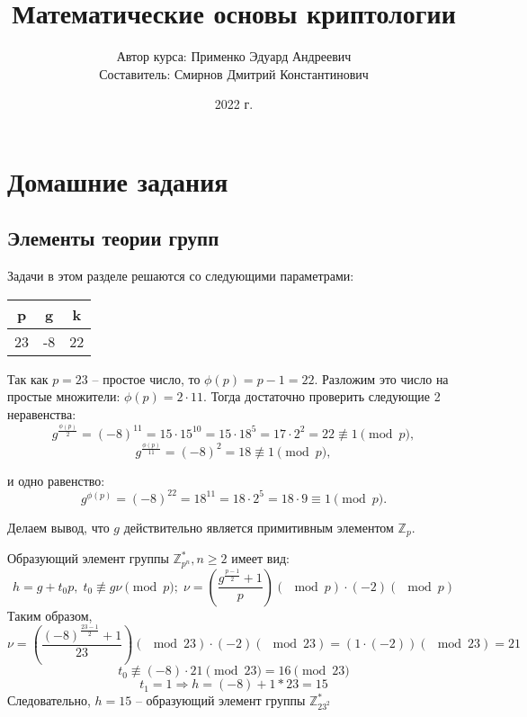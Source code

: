 \documentclass[a4paper,11pt,openany]{book}
\title{Математические основы криптологии}
\author{Автор курса: Применко Эдуард Андреевич \\ 
		Составитель: Смирнов Дмитрий Константинович}
\date{2022 г.}
\begin{document}
\maketitle
\tableofcontents

\mainmatter
\chapter{Домашние задания}

\section{Элементы теории групп}

Задачи в этом разделе решаются со следующими параметрами:

\medskip

{\centering
\begin{tabular}{||c|c|c||}
\hline
\textbf{p} & \textbf{g} & \textbf{k} \\
\hline
23 & -8 & 22 \\
\hline
\end{tabular}

}

\medskip


Так как $p = 23$ -- простое число, то $\phi(p) = p - 1 = 22$. Разложим это число на простые множители: $\phi(p) = 2 \cdot 11$. Тогда достаточно проверить следующие 2 неравенства:
$$ g^{ \frac{\phi(p)}{2} } = (-8) ^ {11} = 15 \cdot 15 ^ {10} = 15 \cdot 18 ^ 5 = 17 \cdot 2 ^ 2 = 22 \not\equiv 1 \pmod p,$$
$$ g^{ \frac{\phi(p)}{11} } = (-8) ^ {2} = 18 \not\equiv 1 \pmod p,$$

\noindent и одно равенство:
$$ g ^ {\phi (p)} = (-8) ^ {22} = 18 ^ {11} = 18 \cdot 2 ^ 5 = 18 \cdot 9 \equiv 1 \pmod p.$$

Делаем вывод, что $g$ действительно является примитивным элементом $\mathbb{Z}_p$.


Образующий элемент группы $\mathbb{Z}_{p^n}^*, n \ge 2$ имеет вид:
$$ h = g + t_0 p, \; t_0 \not \equiv g \nu \pmod p; \; \nu = ( \frac{ g ^ {\frac{p -1}{2}} + 1}{ p } )(\!\!\!\!\!\! \mod p) \cdot (-2)(\!\!\!\!\!\! \mod p)$$
\noindent Таким образом,
$$ \nu = ( \frac{ (-8) ^ {\frac{23 - 1}{2}} + 1}{ 23 } )(\!\!\!\!\!\! \mod 23) \cdot (-2)(\!\!\!\!\!\! \mod 23) = ( 1 \cdot (-2))(\!\!\!\!\!\! \mod 23) = 21$$
$$ t_0 \not \equiv (-8) \cdot 21 \!\!\!\pmod {23} = 16 \!\!\!\pmod {23} $$
$$ t_1 = 1 \Rightarrow h = (-8) + 1 * 23 = 15 $$
Следовательно, $h = 15$ -- образующий элемент группы $\mathbb{Z}_{23^2}^*$
\end{document}
